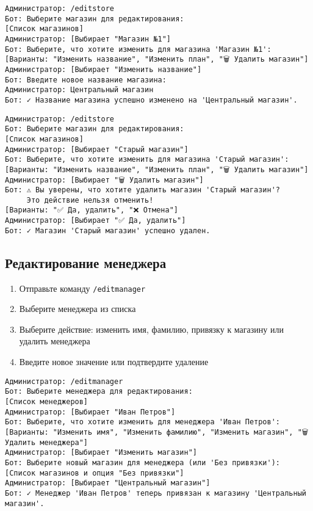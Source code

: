 \documentclass[a4paper,12pt]{article}
\begin{document}
\begin{tcolorbox}[colback=green!5, title=Пример редактирования магазина]
\begin{verbatim}
Администратор: /editstore
Бот: Выберите магазин для редактирования:
[Список магазинов]
Администратор: [Выбирает "Магазин №1"]
Бот: Выберите, что хотите изменить для магазина 'Магазин №1':
[Варианты: "Изменить название", "Изменить план", "🗑 Удалить магазин"]
Администратор: [Выбирает "Изменить название"]
Бот: Введите новое название магазина:
Администратор: Центральный магазин
Бот: ✓ Название магазина успешно изменено на 'Центральный магазин'.
\end{verbatim}
\end{tcolorbox}

\begin{tcolorbox}[colback=red!5, title=Пример удаления магазина]
\begin{verbatim}
Администратор: /editstore
Бот: Выберите магазин для редактирования:
[Список магазинов]
Администратор: [Выбирает "Старый магазин"]
Бот: Выберите, что хотите изменить для магазина 'Старый магазин':
[Варианты: "Изменить название", "Изменить план", "🗑 Удалить магазин"]
Администратор: [Выбирает "🗑 Удалить магазин"]
Бот: ⚠️ Вы уверены, что хотите удалить магазин 'Старый магазин'? 
     Это действие нельзя отменить!
[Варианты: "✅ Да, удалить", "❌ Отмена"]
Администратор: [Выбирает "✅ Да, удалить"]
Бот: ✓ Магазин 'Старый магазин' успешно удален.
\end{verbatim}
\end{tcolorbox}

\subsection{Редактирование менеджера}
\begin{enumerate}
    \item Отправьте команду \texttt{/editmanager}
    \item Выберите менеджера из списка
    \item Выберите действие: изменить имя, фамилию, привязку к магазину или удалить менеджера
    \item Введите новое значение или подтвердите удаление
\end{enumerate}

\begin{tcolorbox}[colback=green!5, title=Пример редактирования менеджера]
\begin{verbatim}
Администратор: /editmanager
Бот: Выберите менеджера для редактирования:
[Список менеджеров]
Администратор: [Выбирает "Иван Петров"]
Бот: Выберите, что хотите изменить для менеджера 'Иван Петров':
[Варианты: "Изменить имя", "Изменить фамилию", "Изменить магазин", "🗑 Удалить менеджера"]
Администратор: [Выбирает "Изменить магазин"]
Бот: Выберите новый магазин для менеджера (или 'Без привязки'):
[Список магазинов и опция "Без привязки"]
Администратор: [Выбирает "Центральный магазин"]
Бот: ✓ Менеджер 'Иван Петров' теперь привязан к магазину 'Центральный магазин'.
\end{verbatim}
\end{tcolorbox}
\end{document}

